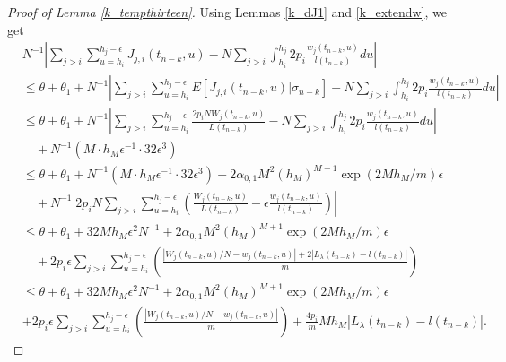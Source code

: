 \documentclass[12pt]{article}
\numberwithin{equation}{section}  %
\begin{document}
\begin{proof}[Proof of Lemma \ref{k_tempthirteen}]
Using Lemmas \ref{k_dJ1} and \ref{k_extendw}, we get
\begin{align} 
&  N^{-1}\left|
\sum_{j>i} \sum_{u=h_i}^{h_j-\epsilon}J_{j,i}(t_{n-k},u)-N
\sum_{j>i} \int_{h_i}^{h_j}2p_i\frac{w_j(t_{n-k},u)}{l(t_{n-k})}du
\right|\nonumber\\
&\leq \theta+\theta_1+  N^{-1}\left|
\sum_{j>i} \sum_{u=h_i}^{h_j-\epsilon}E[J_{j,i}(t_{n-k},u)|\sigma_{n-k}]-N
\sum_{j>i} \int_{h_i}^{h_j}2p_i\frac{w_j(t_{n-k},u)}{l(t_{n-k})}du
\right|\nonumber\\
&\leq \theta+\theta_1+ N^{-1}\left|
\sum_{j>i} \sum_{u=h_i}^{h_j-\epsilon}\frac{2p_i N W_j(t_{n-k},u)}{L(t_{n-k})}-N
\sum_{j>i} \int_{h_i}^{h_j}2p_i \frac{w_j(t_{n-k},u)}{l(t_{n-k})}du
\right|\nonumber\\
&\quad+ N^{-1}(M\cdot h_M\epsilon^{-1}\cdot 32\epsilon^3)\nonumber\\
&\leq \theta+\theta_1
+ N^{-1}(M\cdot h_M\epsilon^{-1}\cdot 32\epsilon^3)+2\alpha_{0,1}M^2(h_M)^{M+1}\exp(2Mh_M/m)\epsilon\nonumber\\
& \quad +N^{-1}\left|
2p_i N \sum_{j>i} \sum_{u=h_i}^{h_j-\epsilon} 
\left(
\frac{ W_j(t_{n-k},u)}{L(t_{n-k})}-\epsilon\frac{ w_j(t_{n-k},u)}{l(t_{n-k})}
\right)
\right|\nonumber\\
&\leq \theta+\theta_1
+32Mh_M\epsilon^{2}N^{-1}+2\alpha_{0,1}M^2(h_M)^{M+1}\exp(2Mh_M/m)\epsilon\nonumber\\
&\quad+2p_i \epsilon   \sum_{j>i} \sum_{u=h_i}^{h_j-\epsilon} 
\left(
\frac{ |W_j(t_{n-k},u)/N- w_j(t_{n-k},u)|+2|L_{\lambda}(t_{n-k})-l(t_{n-k})|}{m}
\right)
\nonumber\\
&\leq \theta+\theta_1
+32Mh_M\epsilon^{2}N^{-1}+2\alpha_{0,1}M^2(h_M)^{M+1}\exp(2Mh_M/m)\epsilon\nonumber\\
&+2p_i\epsilon  \sum_{j>i} \sum_{u=h_i}^{h_j-\epsilon} 
\left(
\frac{ |W_j(t_{n-k},u)/N- w_j(t_{n-k},u)|}{m}
\right)
+\frac{4p_i}{m}Mh_M|L_{\lambda}(t_{n-k})-l(t_{n-k})|.\nonumber
\end{align}
\end{proof}














\footnotesize

\end{document}

